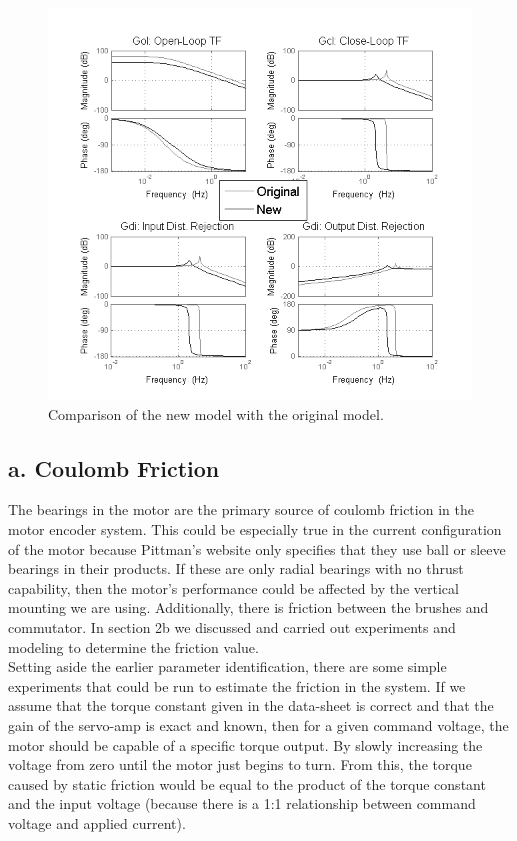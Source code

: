 \documentclass{article}
\theoremstyle{plain}
\theoremstyle{definition}
\theoremstyle{remark}
\begin{document}
\begin{figure}[htb]
\begin{center}
\includegraphics[width = 13.5cm]{Original_vsNew.png}
\caption{Comparison of the new model with the original model.}
\label{q5_orig_v_new}
\end{center}
\end{figure}

\clearpage

\subsection*{a. Coulomb Friction}
The bearings in the motor are the primary source of coulomb friction in the motor encoder system. This could be especially true in the current configuration of the motor because Pittman's website only specifies that they use ball or sleeve bearings in their products. If these are only radial bearings with no thrust capability, then the motor's performance could be affected by the vertical mounting we are using. Additionally, there is friction between the brushes and commutator. In section 2b we discussed and carried out experiments and modeling to determine the friction value.\\


Setting aside the earlier parameter identification, there are some simple experiments that could be run to estimate the friction in the system. If we assume that the torque constant given in the data-sheet is correct and that the gain of the servo-amp is exact and known, then for a given command voltage, the motor should be capable of a specific torque output. By slowly increasing the voltage from zero until the motor just begins to turn. From this, the torque caused by static friction would be equal to the product of the torque constant and the input voltage (because there is a 1:1 relationship between command voltage and applied current). \\
\end{document}
